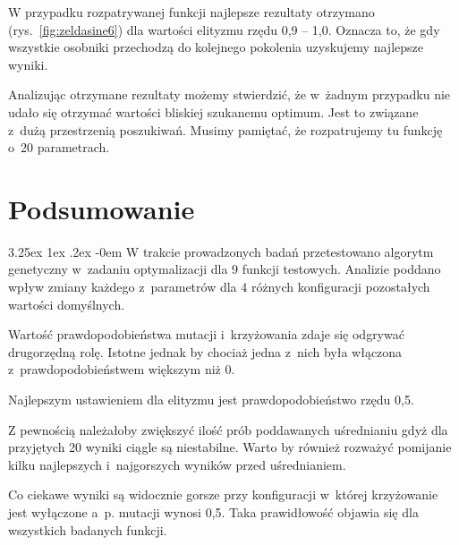 \documentclass[11pt, a4paper]{article}
\makeatletter
\newcommand{\fbi}{\leavevmode{\parindent=1em\indent}}
\renewcommand\paragraph{\@startsection{paragraph}{5}{\z@}
  {3.25ex \@plus1ex \@minus.2ex}
  {-0em}
  {\normalfont\normalsize\bfseries}}
\makeatother
\begin{document}
\fbi
W przypadku rozpatrywanej funkcji najlepsze rezultaty otrzymano (rys.~\ref{fig:zeldasine6}) dla wartości elityzmu rzędu 0,9 -- 1,0. Oznacza to, że gdy wszystkie osobniki przechodzą do kolejnego pokolenia uzyskujemy najlepsze wyniki.

\fbi
Analizując otrzymane rezultaty możemy stwierdzić, że w~żadnym przypadku nie udało się otrzymać wartości bliskiej szukanemu optimum. Jest to związane z~dużą przestrzenią poszukiwań. Musimy pamiętać, że rozpatrujemy tu funkcję o~20 parametrach.

\newpage
\section{Podsumowanie}
\paragraph{}
W trakcie prowadzonych badań przetestowano algorytm genetyczny w~zadaniu optymalizacji dla 9 funkcji testowych. Analizie poddano wpływ zmiany każdego z~parametrów dla 4 różnych konfiguracji pozostałych wartości domyślnych.

\fbi
Wartość prawdopodobieństwa mutacji i~krzyżowania zdaje się odgrywać drugorzędną rolę. Istotne jednak by chociaż jedna z~nich była włączona z~prawdopodobieństwem większym niż 0.

\fbi
Najlepszym ustawieniem dla elityzmu jest prawdopodobieństwo rzędu 0,5.

\fbi
Z pewnością należałoby zwiększyć ilość prób poddawanych uśrednianiu gdyż dla przyjętych 20 wyniki ciągle są niestabilne. Warto by również rozważyć pomijanie kilku najlepszych i~najgorszych wyników przed uśrednianiem.

\fbi
Co ciekawe wyniki są widocznie gorsze przy konfiguracji w~której krzyżowanie jest wyłączone a~p. mutacji wynosi 0,5. Taka prawidłowość objawia się dla wszystkich badanych funkcji.
\end{document}
